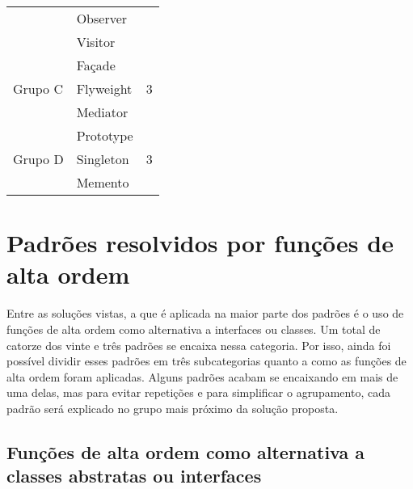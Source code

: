 \begin{quadro}[htb]
\begin{tabular}{@{}llll@{}}
        \multicolumn{2}{l}{}                                   & Observer                &                    \\
        \multicolumn{2}{l}{}                                   & Visitor                 &                    \\ \cmidrule(r){1-4}
        \multicolumn{2}{l}{\multirow{3}{*}{Grupo C}}           & Façade                  & \multirow{3}{*}{3} \\
        \multicolumn{2}{l}{}                                   & Flyweight               &                    \\
        \multicolumn{2}{l}{}                                   & Mediator                &                    \\ \cmidrule(r){1-4}
        \multicolumn{2}{l}{\multirow{3}{*}{Grupo D}}           & Prototype               & \multirow{3}{*}{3} \\ 
        \multicolumn{2}{l}{}                                   & Singleton               &                    \\
        \multicolumn{2}{l}{}                                   & Memento                 &                    \\ \cmidrule(r){1-4} %
    \end{tabular}
\end{quadro}

\section{Padrões resolvidos por funções de alta ordem}

Entre as soluções vistas, a que é aplicada na 
maior parte dos padrões é o uso de funções de alta 
ordem como alternativa a interfaces ou classes. 
Um total de catorze dos vinte e três padrões 
se encaixa nessa categoria. Por isso, ainda foi 
possível dividir esses padrões em três  
subcategorias quanto a como as funções de alta 
ordem foram aplicadas. Alguns padrões acabam se 
encaixando em mais de uma delas, mas para 
evitar repetições e para simplificar o agrupamento, 
cada padrão será explicado no grupo mais próximo 
da solução proposta. 

\subsection{Funções de alta ordem como alternativa a 
            classes abstratas ou interfaces}

